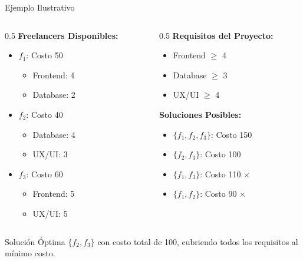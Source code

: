 \documentclass[10pt]{beamer}
\begin{document}
\begin{frame}{Ejemplo Ilustrativo}
    \begin{columns}
        \begin{column}{0.5\textwidth}
            \textbf{Freelancers Disponibles:}
            \begin{itemize}
                \item $f_1$: Costo 50
                \begin{itemize}
                    \item Frontend: 4
                    \item Database: 2
                \end{itemize}
                \item $f_2$: Costo 40
                \begin{itemize}
                    \item Database: 4
                    \item UX/UI: 3
                \end{itemize}
                \item $f_3$: Costo 60
                \begin{itemize}
                    \item Frontend: 5
                    \item UX/UI: 5
                \end{itemize}
            \end{itemize}
        \end{column}
        \begin{column}{0.5\textwidth}
            \textbf{Requisitos del Proyecto:}
            \begin{itemize}
                \item Frontend $\geq$ 4
                \item Database $\geq$ 3
                \item UX/UI $\geq$ 4
            \end{itemize}
            \vspace{0.5cm}
            \textbf{Soluciones Posibles:}
            \begin{itemize}
                \item $\{f_1, f_2, f_3\}$: Costo 150
                \item $\{f_2, f_3\}$: Costo 100 \checkmark
                \item $\{f_1, f_3\}$: Costo 110 $\times$
                \item $\{f_1, f_2\}$: Costo 90 $\times$
            \end{itemize}
        \end{column}
    \end{columns}
    \vspace{0.3cm}
    \begin{alertblock}{Solución Óptima}
        $\{f_2, f_3\}$ con costo total de 100, cubriendo todos los requisitos al mínimo costo.
    \end{alertblock}
\end{frame}
\end{document}
